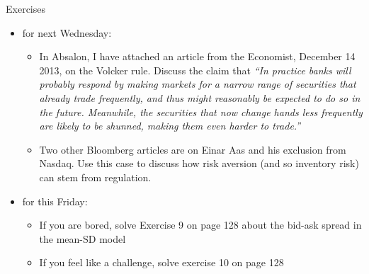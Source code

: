\documentclass[english,10pt
,aspectratio=169
]{beamer}
\begin{document}
\begin{frame}{Exercises}
	\begin{itemize}
		\item for next Wednesday:
		\begin{itemize}
			\item In Absalon, I have attached an article from the Economist, December 14 2013, on the Volcker rule. Discuss the claim that \emph{``In practice banks will probably respond by making markets for a narrow range of securities that already trade frequently, and thus might reasonably be expected to do so in the future. Meanwhile, the securities that now change hands less frequently are likely to be shunned, making them even harder to trade.''}
			\item Two other Bloomberg articles are on Einar Aas and his exclusion from Nasdaq. Use this case to discuss how risk aversion (and so inventory risk) can stem from regulation.
		\end{itemize}
		\item for this Friday:
		\begin{itemize}
			\item If you are bored, solve Exercise 9 on page 128 about the bid-ask spread in the mean-SD model
			\item If you feel like a challenge, solve exercise 10 on page 128
		\end{itemize}
	\end{itemize}
\end{frame}
\end{document}
